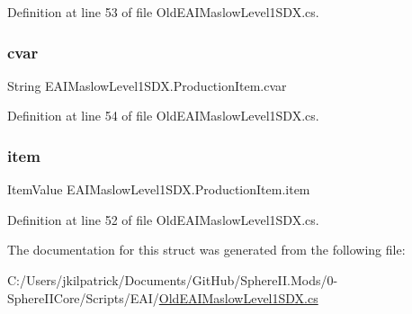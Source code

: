 Definition at line 53 of file Old\+E\+A\+I\+Maslow\+Level1\+S\+D\+X.\+cs.

\mbox{\label{struct_e_a_i_maslow_level1_s_d_x_1_1_production_item_a7817855d908c8afe77891173c8419e0d}} 
\subsubsection{\texorpdfstring{cvar}{cvar}}
{\footnotesize\ttfamily String E\+A\+I\+Maslow\+Level1\+S\+D\+X.\+Production\+Item.\+cvar}



Definition at line 54 of file Old\+E\+A\+I\+Maslow\+Level1\+S\+D\+X.\+cs.

\mbox{\label{struct_e_a_i_maslow_level1_s_d_x_1_1_production_item_a60182809129a3797be97a599bcc8d7ca}} 
\subsubsection{\texorpdfstring{item}{item}}
{\footnotesize\ttfamily Item\+Value E\+A\+I\+Maslow\+Level1\+S\+D\+X.\+Production\+Item.\+item}



Definition at line 52 of file Old\+E\+A\+I\+Maslow\+Level1\+S\+D\+X.\+cs.



The documentation for this struct was generated from the following file\+:\begin{DoxyCompactItemize}
\item 
C\+:/\+Users/jkilpatrick/\+Documents/\+Git\+Hub/\+Sphere\+I\+I.\+Mods/0-\/\+Sphere\+I\+I\+Core/\+Scripts/\+E\+A\+I/\mbox{\hyperlink{_old_e_a_i_maslow_level1_s_d_x_8cs}{Old\+E\+A\+I\+Maslow\+Level1\+S\+D\+X.\+cs}}\end{DoxyCompactItemize}
